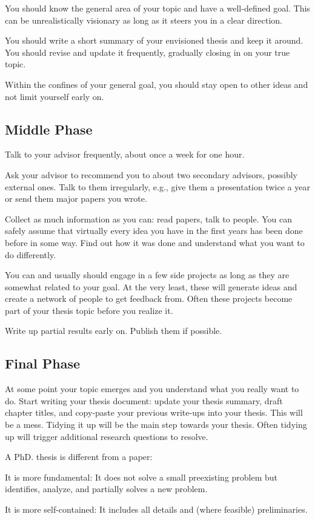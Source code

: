 \documentclass[12pt]{article}
\begin{document}
You should know the general area of your topic and have a well-defined goal.
This can be unrealistically visionary as long as it steers you in a clear direction.
\medskip

You should write a short summary of your envisioned thesis and keep it around.
You should revise and update it frequently, gradually closing in on your true topic.
\medskip

Within the confines of your general goal, you should stay open to other ideas and not limit yourself early on.

\subsection{Middle Phase}

Talk to your advisor frequently, about once a week for one hour.
\medskip

Ask your advisor to recommend you to about two secondary advisors, possibly external ones.
Talk to them irregularly, e.g., give them a presentation twice a year or send them major papers you wrote.
\medskip

Collect as much information as you can: read papers, talk to people.
You can safely assume that virtually every idea you have in the first years has been done before in some way.
Find out how it was done and understand what you want to do differently.
\medskip

You can and usually should engage in a few side projects as long as they are somewhat related to your goal.
At the very least, these will generate ideas and create a network of people to get feedback from.
Often these projects become part of your thesis topic before you realize it.
\medskip

Write up partial results early on.
Publish them if possible.

\subsection{Final Phase}

At some point your topic emerges and you understand what you really want to do.
Start writing your thesis document: update your thesis summary, draft chapter titles, and copy-paste your previous write-ups into your thesis.
This will be a mess.
Tidying it up will be the main step towards your thesis.
Often tidying up will trigger additional research questions to resolve.
\medskip

A PhD. thesis is different from a paper:
\begin{compactitem}
\item It is more fundamental: It does not solve a small preexisting problem but identifies, analyze, and partially solves a new problem.
\item It is more self-contained: It includes all details and (where feasible) preliminaries.
\end{compactitem}
\medskip
\end{document}

